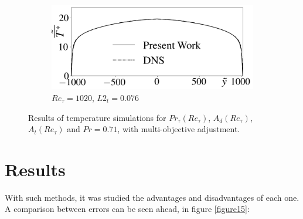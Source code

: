 \documentclass[10pt]{article} %
\begin{document}
\begin{figure}[!h]
\begin{subfigure}[t]{0.5\textwidth}
	\end{subfigure}
	\begin{subfigure}[t]{0.45\textwidth}
		\centering
		\includegraphics[angle=0, scale=0.24]{fotos_formatacao_final/Temperature_1000_071_Genetic2temperature}
		\caption{$Re_\tau = 1020$, $L2_t = 0.076$}
	\end{subfigure}	
	\caption{Results of temperature simulations for $Pr_\tau(Re_\tau)$, $A_d(Re_\tau)$, $A_t(Re_\tau) $ and $Pr =0.71$, with multi-objective adjustment.}
	\vspace{-5mm}
\end{figure}

\newpage


 
\section{Results}

With such methods, it was studied the advantages and disadvantages of each one. A comparison between errors can be seen ahead, in figure \ref{figure15}:\\
\vspace{-0.5cm}
\end{document}
